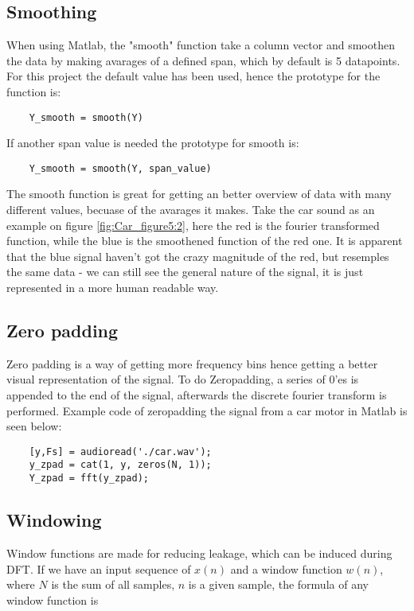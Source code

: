 \subsection{Smoothing}

When using Matlab, the "smooth" function take a column vector and smoothen the data by making avarages of a defined span, which by default is 5 datapoints\cite[smooth]{MATLAB_DOC}. 
For this project the default value has been used, hence the prototype for the function is:

\begin{verbatim}
	Y_smooth = smooth(Y)
\end{verbatim}
If another span value is needed the prototype for smooth is:


\begin{verbatim}
	Y_smooth = smooth(Y, span_value)
\end{verbatim}

The smooth function is great for getting an better overview of data with many different values, becuase of the avarages it makes. 
Take the car sound as an example on figure \ref{fig:Car_figure5:2}, here the red is the fourier transformed function, while the blue is the smoothened function of the red one. 
It is apparent that the blue signal haven't got the crazy magnitude of the red, but resemples the same data - we can still see the general nature of the signal, it is just represented in a more human readable way.

\subsection{Zero padding}

Zero padding is a way of getting more frequency bins hence getting a better visual representation of the signal. 
To do Zeropadding, a series of 0'es is appended to the end of the signal, afterwards the discrete fourier transform is performed. 
Example code of zeropadding the signal from a car motor in Matlab is seen below:

\begin{verbatim}
	[y,Fs] = audioread('./car.wav');
	y_zpad = cat(1, y, zeros(N, 1));
	Y_zpad = fft(y_zpad);
\end{verbatim}

\subsection{Windowing}

Window functions are made for reducing leakage, which can be induced during DFT. If we have an input sequence of $x(n)$ and a window function $w(n)$, where $N$ is the sum of all samples, $n$ is a given sample, the formula of any window function is


